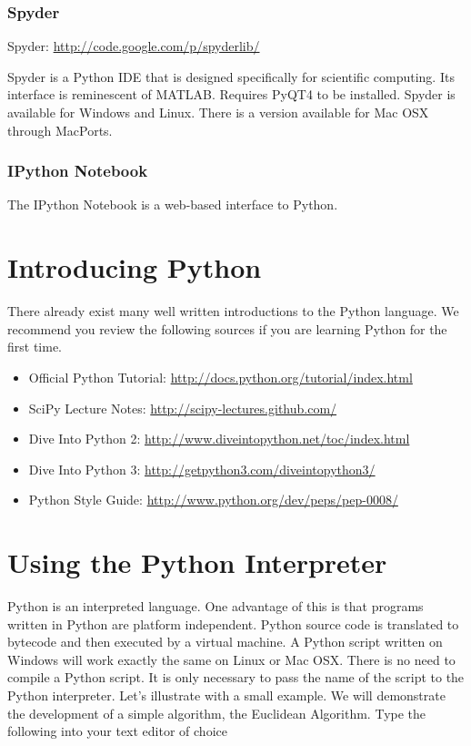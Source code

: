 \subsubsection*{Spyder}

Spyder: \url{http://code.google.com/p/spyderlib/}

Spyder is a Python IDE that is designed specifically for scientific computing.  Its interface is reminescent of MATLAB.  Requires PyQT4 to be installed.  Spyder is available for Windows and Linux.  There is a version available for Mac OSX through MacPorts.

\subsubsection*{IPython Notebook}
The IPython Notebook is a web-based interface to Python.

\section*{Introducing Python}
There already exist many well written introductions to the Python language.  We recommend you review the following sources if you are learning Python for the first time.

\begin{itemize}
\item Official Python Tutorial: \url{http://docs.python.org/tutorial/index.html}
\item SciPy Lecture Notes: \url{http://scipy-lectures.github.com/}
\item Dive Into Python 2: \url{http://www.diveintopython.net/toc/index.html}
\item Dive Into Python 3: \url{http://getpython3.com/diveintopython3/}
\item Python Style Guide: \url{http://www.python.org/dev/peps/pep-0008/}
\end{itemize}

\section*{Using the Python Interpreter}
Python is an interpreted language.  One advantage of this is that programs written in Python are platform independent.  Python source code is translated to bytecode and then executed by a virtual machine.  A Python script written on Windows will work exactly the same on Linux or Mac OSX.  There is no need to compile a Python script.  It is only necessary to pass the name of the script to the Python interpreter.  Let's illustrate with a small example.  We will demonstrate the development of a simple algorithm, the Euclidean Algorithm.  Type the following into your text editor of choice


